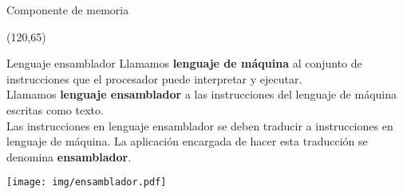 \documentclass[aspectratio=169]{beamer}
\begin{document}
\begin{frame}[fragile,t]{Componente de memoria}
\begin{textblock}{76}
    \end{textblock}
    \begin{textblock}{76}(120,65)
    \end{textblock}
\end{frame}

\begin{frame}[fragile,t]{Lenguaje ensamblador}
    Llamamos \textbf{lenguaje de máquina} al conjunto de instrucciones que el procesador puede interpretar y ejecutar. \\
    Llamamos \textbf{lenguaje ensamblador} a las instrucciones del lenguaje de máquina escritas como texto.\\
    \bigskip
    \pause
    Las instrucciones en lenguaje ensamblador se deben traducir a instrucciones en lenguaje de máquina.
    La aplicación encargada de hacer esta traducción se denomina \textbf{ensamblador}.\\
    \begin{center}
    \texttt{[image: img/ensamblador.pdf]} 
    \end{center}
\end{frame}
\end{document}
